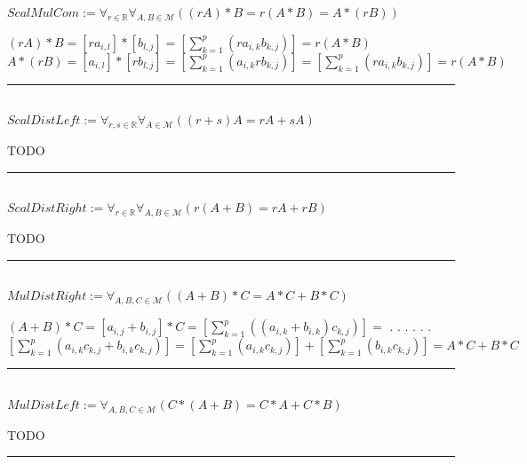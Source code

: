 \documentclass{book}
\newcommand{\abr}{:=}
\newcommand{\cont}{\phantom{.}. . .\phantom{.}}
\begin{document}
$ScalMulCom \abr \forall_{r \in \mathbb{R}} \forall_{A, B \in \mathcal{M}}((r A) * B = r (A * B) = A * (r B))$
\begin{enumerate}
  \lit $(r A) * B = [r a_{i, l}] * [b_{l, j}] = \left[\sum_{k = 1}^{p}(r a_{i, k} b_{k, j})\right] = r (A * B)$
  \lit $A * (r B) = [a_{i, l}] * [r b_{l, j}] = \left[\sum_{k = 1}^{p}(a_{i, k} r b_{k, j})\right] = \left[\sum_{k = 1}^{p}(r a_{i, k} b_{k, j})\right] = r (A * B)$
\end{enumerate} \vspace{.75mm} \hrule \vspace{.75mm} \ \\ 

$ScalDistLeft \abr \forall_{r, s \in \mathbb{R}} \forall_{A \in \mathcal{M}}((r + s) A = r A + s A)$
\begin{enumerate}
  \lit TODO
\end{enumerate} \vspace{.75mm} \hrule \vspace{.75mm} \ \\ 

$ScalDistRight \abr \forall_{r \in \mathbb{R}} \forall_{A, B \in \mathcal{M}}(r (A + B) = r A + r B)$
\begin{enumerate}
  \lit TODO
\end{enumerate} \vspace{.75mm} \hrule \vspace{.75mm} \ \\ 

$MulDistRight \abr \forall_{A, B, C \in \mathcal{M}}((A + B) * C = A * C + B * C)$
\begin{enumerate}
  \lit $(A + B) * C = [a_{i, j} + b_{i, j}] * C = \left[\sum_{k = 1}^{p}((a_{i, k} + b_{i, k}) c_{k, j})\right] = $ \cont
  \lit \cont $\left[\sum_{k = 1}^{p}(a_{i, k} c_{k, j} + b_{i, k} c_{k, j})\right] = \left[\sum_{k = 1}^{p}(a_{i, k} c_{k, j})\right] + \left[\sum_{k = 1}^{p}(b_{i, k} c_{k, j})\right] = A * C + B * C$
\end{enumerate} \vspace{.75mm} \hrule \vspace{.75mm} \ \\ 

$MulDistLeft \abr \forall_{A, B, C \in \mathcal{M}}(C * (A + B) = C * A + C * B)$
\begin{enumerate}
  \lit TODO
\end{enumerate} \vspace{.75mm} \hrule \vspace{.75mm} \ \\ 
\end{document}
